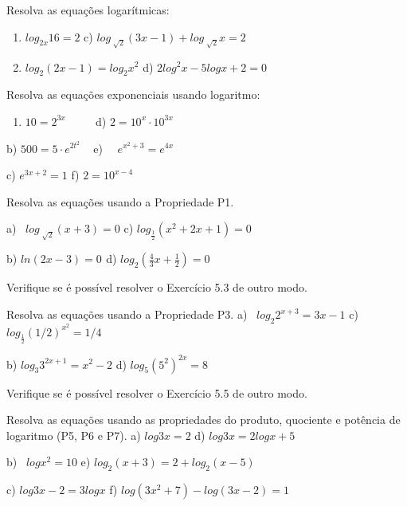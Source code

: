 \begin{exercicios}
	\exitem{} Resolva as equações logarítmicas:
\begin{enumerate}
	    \item  \( log_{2x}16=2 \)  \quad \quad \quad c)  \( log_{\sqrt[]{2}} \left( 3x-1 \right) +log_{\sqrt[]{2}} x=2 \) 

    	\item  \( log_{2} \left( 2x-1 \right) =log_{2} x^{2} \) \quad \quad d)  \( 2 log^{2}x-5logx+2=0  \) 
\end{enumerate}

	\exitem{} Resolva as equações exponenciais usando logaritmo:
    \begin{enumerate}
	    \item  \( 10=2^{3x} \) \quad ~~~~ \quad \quad  d)  \( 2=10^{x} \cdot  10^{3x} \)    
    \end{enumerate}

    b) \( 500=5 \cdot e^{2t^{2}} \) ~ \quad \quad  e)~~  \( e^{x^{2}+3}=e^{4x} \) 

    c)  \( e^{3x+2}=1 \) \quad \quad \quad  f)  \( 2=10^{x-4} \) 

	\exitem{} Resolva as equações usando a Propriedade P1.

    a)~  \( log_{\sqrt[]{2}} \left( x+3 \right) =0 \) \quad \quad c)  \( log_{\frac{1}{2}} \left( x^{2}+2x+1 \right) =0 \) ~ 

    b)  \( ln \left( 2x-3 \right) =0 _{} \) \quad \quad d)  \( log_{2} \left( \frac{4}{3}x+\frac{1}{2}  \right) =0 \) 

	\exitem{} Verifique se é possível resolver o Exercício 5.3 de outro modo.

	\exitem{} Resolva as equações usando a Propriedade P3.
    a)~  \( log_{2}2^{x+3}=3x-1 \) \quad \quad c)  \( log_{\frac{1}{2}} \left( 1/2 \right) ^{x^{2}}=1/4 \) ~ 

    b)  \( log_{3}3^{2x+1}=x^{2}-2 \) \quad \quad d)  \( log_{5} \left( 5^{2}  \right) ^{2x}=8 \) 

	\exitem{} Verifique se é possível resolver o Exercício 5.5 de outro modo.

    \exitem{} Resolva as equações usando as propriedades do produto, quociente e potência de logaritmo (P5, P6 e P7).
    a)  \( log3x=2  \) \quad \quad \quad \quad d)  \( log3x=2logx+5 \) 

    b)~  \( logx^{2}=10 \) \quad \quad \quad e)  \( log_{2} \left( x+3 \right) =2+log_{2} \left( x-5 \right)  \) 
    
    c)  \( log3x-2=3logx \) \quad \quad f)  \( log \left( 3x^{2}+7 \right) -log \left( 3x-2 \right) =1 \) 


\end{exercicios}
